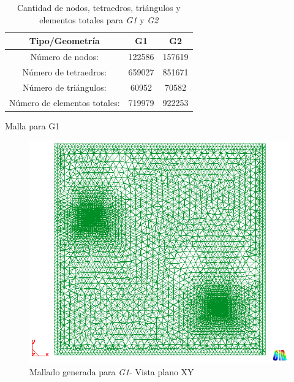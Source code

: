 \documentclass[spanish]{beamer}
\begin{document}
\begin{frame}
\begin{table}[tbhp]
\begin{center}\begin{tabular}{ccc}
\hline \textbf{Tipo/Geometría} & \textbf{G1} & \textbf{G2} \\ 
\hline Número de nodos: & 122586 & 157619 \\ 
\hline Número de tetraedros: & 659027 & 851671\\ 
\hline Número de triángulos: & 60952  & 70582 \\ 
\hline Número de elementos totales: & 719979 & 922253 \\ 
\hline 
\end{tabular}\end{center}
\caption{Cantidad de nodos, tetraedros, triángulos y elementos totales para \emph{G1} y \emph{G2}}
\label{tabla_lista_elementos}
\end{table}
\end{frame}
%
\begin{frame}{Malla para G1}\begin{center}
\begin{figure}[tbhp]
\centerline{\includegraphics[scale=0.25]{../img/100m/100_xy_contorno_malla}}
\caption{Mallado generada para \emph{G1}- Vista plano XY}
\label{100_xy_contorno_malla}
\end{figure}
\end{center}\end{frame}
\end{document}
